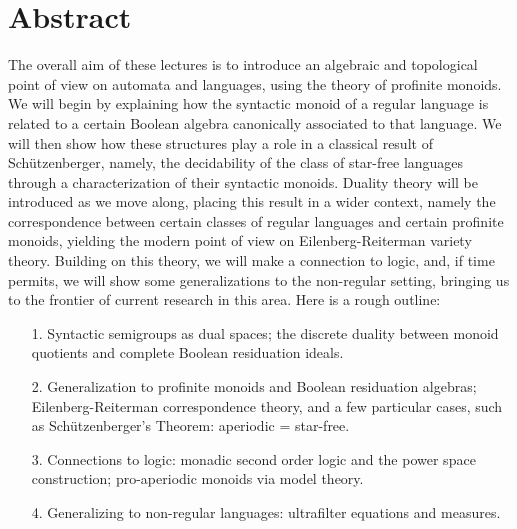\section*{Abstract}
The overall aim of these lectures is to introduce an algebraic and topological point of view on automata and languages, using the theory of profinite monoids. We will begin by explaining how the syntactic monoid of a regular language is related to a certain Boolean algebra canonically associated to that language. We will then show how these structures play a role in a classical result of Schützenberger, namely, the decidability of the class of star-free languages through a characterization of their syntactic monoids. Duality theory will be introduced as we move along, placing this result in a wider context, namely the correspondence between certain classes of regular languages and certain profinite monoids, yielding the modern point of view on Eilenberg-Reiterman variety theory. Building on this theory, we will make a connection to logic, and, if time permits, we will show some generalizations to the non-regular setting, bringing us to the frontier of current research in this area. Here is a rough outline:
\begin{enumerate}
\item[1.]  Syntactic semigroups as dual spaces; the discrete duality between monoid quotients and complete Boolean residuation ideals.
\item[2.]   Generalization to profinite monoids and Boolean residuation algebras; Eilenberg-Reiterman correspondence theory, and a few particular cases, such as Schützenberger's Theorem: aperiodic = star-free.
\item[3.]    Connections to logic: monadic second order logic and the power space construction; pro-aperiodic monoids via model theory.
\item[4.]   Generalizing to non-regular languages: ultrafilter equations and measures.
\end{enumerate}


